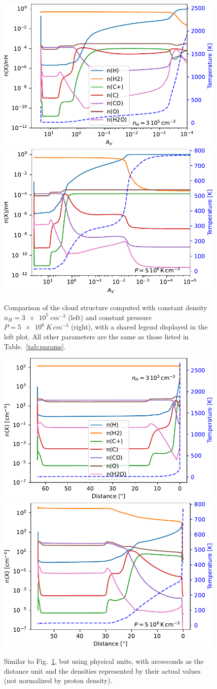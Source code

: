 \documentclass[12pt,a4paper]{article}
\begin{document}
\begin{figure}[ht]
    \centering
    \includegraphics[width=.49\textwidth,keepaspectratio]{struct_nH3e5.pdf}
    \includegraphics[width=.49\textwidth,keepaspectratio]{struct_P5e6.pdf}
    \caption{Comparison of the cloud structure computed with constant density $n_H = \qty{3e5}{cm^{-3}}$ (left) and constant pressure $P = \qty{5e6}{K\,cm^{-3}}$ (right), with a shared legend displayed in the left plot. All other parameters are the same as those listed in Table.~\ref{tab:params}.} \label{fig:cmp_cstp_cstn}
\end{figure}

\begin{figure}[hb]
    \centering
    \includegraphics[width=.49\textwidth,keepaspectratio]{struct_nH3e5_arcsec.pdf}
    \includegraphics[width=.49\textwidth,keepaspectratio]{struct_P5e6_arcsec.pdf}
    \caption{Similar to Fig.~\ref{fig:cmp_cstp_cstn}, but using physical units, with arcseconds as the distance unit and the densities represented by their actual values (not normalized by proton density).} \label{fig:cmp_cstp_cstn_arcsec}
\end{figure}
\end{document}
